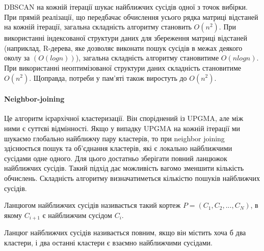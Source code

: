             DBSCAN на кожній ітерації шукає найближчих сусідів одної з точок вибірки. При прямій реалізації, що передбачає обчислення усього рядка матриці відстаней на кожній ітерації, загальна складність алгоритму становить $O(n^2)$. При використанні індексованої структури даних для збереження матриці відстаней (наприклад, R-дерева, яке дозволяє виконати пошук сусідів в межах деякого околу за $(O(log n))$), загальна складність алгоритму становитиме $O(n log n)$. При використанні неоптимізованої структури даних складність становитиме $O(n^2)$. Щоправда, потреби у пам'яті також виростуть до $O(n^2)$.
        
        \paragraph {Neighbor-joining} \cite{NeighborJoining}
            Це алгоритм ієрархічної кластеризації. Він споріднений із UPGMA, але між ними є суттєві відмінності. Якщо у випадку UPGMA на кожній ітерації ми шукаємо глобально найближчу пару кластерів, то при neighbor joining здіснюється пошук та об'єднання кластерів, які є локально найближчими сусідами одне одного. Для цього достатньо зберігати повний ланцюжок найближчих сусідів. Такий підхід дає можливість вагомо зменшити кількість обчислень. Складність алгоритму визначатиметься кількістю пошуків найближчих сусідів.
            
            \begin{definition}
                Ланцюгом найближчих сусідів називається такий кортеж $P = (C_1, C_2, ..., C_N)$, в якому $C_{i+1}$ є найближчим сусідом $C_i$.
            \end{definition}
            
            \begin{definition}
                Ланцюг найближчих сусідів називається повним, якщо він містить хоча б два кластери, і два останні кластери є взаємно найближчими сусідами.
            \end{definition}
            
